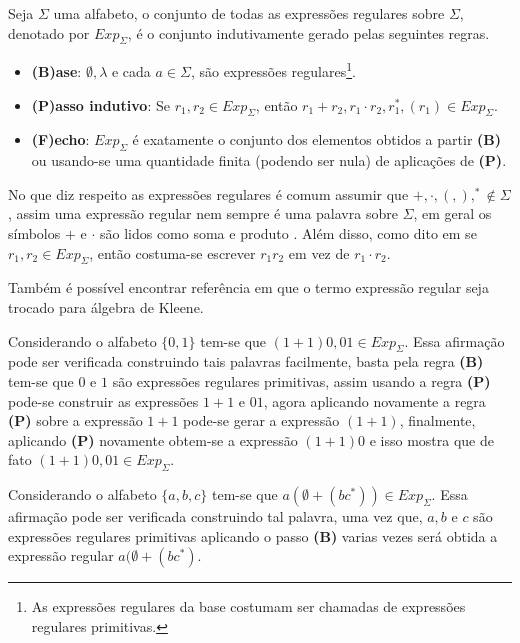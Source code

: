 \begin{definition}\label{def:ExpRegularesSintaxe}
	Seja $\Sigma$ uma alfabeto, o conjunto de todas as expressões regulares sobre $\Sigma$, denotado por $Exp_\Sigma$, é o conjunto indutivamente gerado pelas seguintes regras.
	\begin{itemize}
		\item[ ]\textbf{(B)ase}: $\emptyset, \lambda$ e cada $a \in \Sigma$, são expressões regulares\footnote{As expressões regulares da base costumam ser chamadas de expressões regulares primitivas.}.
		\item[ ]\textbf{(P)asso indutivo}:  Se $r_1, r_2 \in Exp_\Sigma$, então $r_1 + r_2, r_1 \cdot r_2, r_1^*, (r_1) \in Exp_\Sigma$.
		\item[ ]\textbf{(F)echo}: $Exp_\Sigma$ é exatamente o conjunto dos elementos obtidos a partir \textbf{(B)} ou usando-se uma quantidade finita (podendo ser nula) de aplicações de \textbf{(P)}.
	\end{itemize}
\end{definition}

No que diz respeito as expressões regulares é comum assumir que $+, \cdot, (, ), ^* \notin \Sigma$, assim uma expressão regular nem sempre é uma palavra sobre $\Sigma$, em geral os símbolos $+$ e $\cdot$ são lidos como soma e produto \cite{carroll1989}. Além disso, como dito em \cite{benjaLivro2010} se $r_1, r_2 \in Exp_\Sigma$, então costuma-se escrever $r_1r_2$ em vez de $r_1\cdot r_2$.

\begin{remark}
	Também é possível encontrar referência em que o termo expressão regular seja trocado para álgebra de Kleene.
\end{remark}

\begin{example}
	Considerando o alfabeto $\{0,1\}$ tem-se que $(1 + 1)0, 01 \in Exp_\Sigma$. Essa afirmação pode ser verificada construindo tais palavras facilmente, basta pela regra \textbf{(B)} tem-se que  $0$ e $1$ são expressões regulares primitivas, assim usando a regra \textbf{(P)} pode-se construir as expressões $1 + 1$ e $01$, agora aplicando novamente a regra \textbf{(P)} sobre a expressão $1 + 1$ pode-se gerar a expressão $(1 + 1)$, finalmente, aplicando \textbf{(P)} novamente obtem-se a expressão $(1+1)0$ e isso mostra que de fato $(1 + 1)0, 01 \in Exp_\Sigma$.
\end{example}

\begin{example}
	Considerando o alfabeto $\{a, b, c\}$ tem-se que $a(\emptyset + (bc^*)) \in Exp_\Sigma$. Essa afirmação pode ser verificada construindo tal palavra, uma vez que, $a, b$ e $c$ são expressões regulares primitivas aplicando o passo \textbf{(B)} varias vezes será obtida a expressão regular $a(\emptyset + (bc^*)$.
\end{example}

